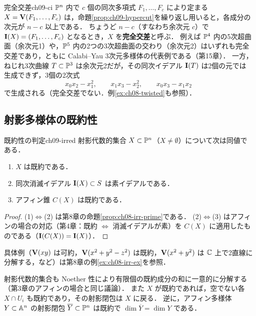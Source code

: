 \begin{myex}{完全交差}{ch09-ci}
$\mathbb{P}^n$ 内で $c$ 個の同次多項式 $F_1,\dots,F_c$ により定まる $X=\mathbf{V}(F_1,\dots,F_c)$ は，命題\ref{prop:ch09-hypercut}を繰り返し用いると，各成分の次元が $n-c$ 以上である．
ちょうど $n-c$（すなわち余次元 $c$）で $\mathbf{I}(X)=(F_1,\dots,F_c)$ となるとき，$X$ を\textbf{完全交差}と呼ぶ．
例えば $\mathbb{P}^4$ 内の5次超曲面（余次元1）や，$\mathbb{P}^5$ 内の2つの3次超曲面の交わり（余次元2）はいずれも完全交差であり，ともに Calabi--Yau 3次元多様体の代表例である（第15章）．
一方，ねじれ3次曲線 $T\subset\mathbb{P}^3$ は余次元2だが，その同次イデアル $\mathbf{I}(T)$ は2個の元では生成できず，3個の2次式
\[
  x_0x_2-x_1^2,\qquad x_1x_3-x_2^2,\qquad x_0x_3-x_1x_2
\]
で生成される（完全交差でない．例\ref{ex:ch08-twisted}も参照）．
\end{myex}

\subsection{射影多様体の既約性}

\begin{myprop}{既約性の判定}{ch09-irred}
射影代数的集合 $X\subset\mathbb{P}^n$（$X\neq\emptyset$）について次は同値である．
\begin{enumerate}
  \item $X$ は既約である．
  \item 同次消滅イデアル $\mathbf{I}(X)\subset S$ は素イデアルである．
  \item アフィン錐 $C(X)$ は既約である．
\end{enumerate}
\end{myprop}

\begin{proof}
(1)$\Leftrightarrow$(2) は第8章の命題\ref{prop:ch08-irr-prime}である．
(2)$\Leftrightarrow$(3) はアフィンの場合の対応（第4章：既約 $\Leftrightarrow$ 消滅イデアルが素）を $C(X)$ に適用したものである（$\mathbf{I}(C(X))=\mathbf{I}(X)$）．
\end{proof}

具体例（$\mathbf{V}(xy)$ は可約，$\mathbf{V}(x^2+y^2-z^2)$ は既約，$\mathbf{V}(x^2+y^2)$ は $\mathbb{C}$ 上で2直線に分解する，など）は第8章の例\ref{ex:ch08-irr-ex}を参照．

射影代数的集合も Noether 性により有限個の既約成分の和に一意的に分解する（第3章のアフィンの場合と同じ議論）．
また $X$ が既約であれば，空でない各 $X\cap U_i$ も既約であり，その射影閉包は $X$ に戻る．
逆に，アフィン多様体 $Y\subset\mathbb{A}^n$ の射影閉包 $\overline{Y}\subset\mathbb{P}^n$ は既約で $\dim\overline{Y}=\dim Y$ である．

